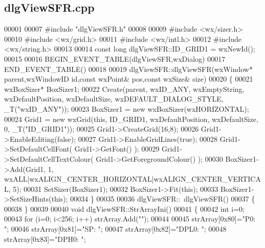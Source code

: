 \subsection{dlg\+View\+S\+F\+R.\+cpp}
\label{dlgViewSFR_8cpp_source}

\begin{DoxyCode}
00001 
00007 \textcolor{preprocessor}{#include "dlgViewSFR.h"}
00008 
00009 \textcolor{preprocessor}{#include <wx/sizer.h>}
00010 \textcolor{preprocessor}{#include <wx/grid.h>}
00011 \textcolor{preprocessor}{#include <wx/intl.h>}
00012 \textcolor{preprocessor}{#include <wx/string.h>}
00013 
00014 \textcolor{keyword}{const} \textcolor{keywordtype}{long} dlgViewSFR::ID_GRID1 = wxNewId();
00015 
00016 BEGIN\_EVENT\_TABLE(dlgViewSFR,wxDialog)
00017 END\_EVENT\_TABLE()
00018 
00019 dlgViewSFR::dlgViewSFR(wxWindow* parent,wxWindowID \textcolor{keywordtype}{id},const wxPoint& pos,const wxSize& 
      size)
00020 \{
00021     wxBoxSizer* BoxSizer1;
00022     Create(parent, wxID\_ANY, wxEmptyString, wxDefaultPosition, wxDefaultSize, wxDEFAULT\_DIALOG\_STYLE, 
      _T(\textcolor{stringliteral}{"wxID\_ANY"}));
00023     BoxSizer1 = \textcolor{keyword}{new} wxBoxSizer(wxHORIZONTAL);
00024     Grid1 = \textcolor{keyword}{new} wxGrid(\textcolor{keyword}{this}, ID\_GRID1, wxDefaultPosition, wxDefaultSize, 0, _T(\textcolor{stringliteral}{"ID\_GRID1"}));
00025     Grid1->CreateGrid(16,8);
00026     Grid1->EnableEditing(\textcolor{keyword}{false});
00027     Grid1->EnableGridLines(\textcolor{keyword}{true});
00028     Grid1->SetDefaultCellFont( Grid1->GetFont() );
00029     Grid1->SetDefaultCellTextColour( Grid1->GetForegroundColour() );
00030     BoxSizer1->Add(Grid1, 1, wxALL|wxALIGN\_CENTER\_HORIZONTAL|wxALIGN\_CENTER\_VERTICAL, 5);
00031     SetSizer(BoxSizer1);
00032     BoxSizer1->Fit(\textcolor{keyword}{this});
00033     BoxSizer1->SetSizeHints(\textcolor{keyword}{this});
00034 \}
00035 
00036 dlgViewSFR::~dlgViewSFR()
00037 \{   
00038 \}
00039 
00040 \textcolor{keywordtype}{void} dlgViewSFR::StrArrayIni() 
00041 \{
00042     \textcolor{keywordtype}{int} i=0;
00043     \textcolor{keywordflow}{for} (i=0; i<256; i++) strArray.Add(\textcolor{stringliteral}{""});
00044 
00045     strArray[0x80]=\textcolor{stringliteral}{"P0: "};
00046     strArray[0x81]=\textcolor{stringliteral}{"SP: "};
00047     strArray[0x82]=\textcolor{stringliteral}{"DPL0: "};
00048     strArray[0x83]=\textcolor{stringliteral}{"DPH0: "};

\end{DoxyCode}
